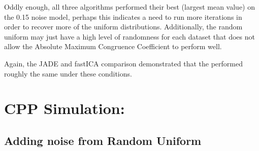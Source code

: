 \documentclass[12pt,twoside]{amherstthesis}
\begin{document}
  Oddly enough, all three algorithms performed their best (largest mean
  value) on the 0.15 noise model, perhaps this indicates a need to run
  more iterations in order to recover more of the uniform distributions.
  Additionally, the random uniform may just have a high level of
  randomness for each dataset that does not allow the Absolute Maximum
  Congruence Coefficient to perform well.
  
  Again, the JADE and fastICA comparison demonstrated that the performed
  roughly the same under these conditions.
  
  \section{CPP Simulation:}\label{cpp-simulation}
  
  \subsection{Adding noise from Random
  Uniform}\label{adding-noise-from-random-uniform}
  
  \begin{Shaded}
  \begin{Highlighting}[]
  \StringTok{ }
  \NormalTok{(}\NormalTok{)}
  \StringTok{ }\NormalTok{CPPdata[}\NormalTok{(}\NormalTok{),]}
  \NormalTok{(}\NormalTok{(}\NormalTok{),}\NormalTok{,}\NormalTok{)}
  \StringTok{ }
  \StringTok{ }\NormalTok{(}\NormalTok{,}\NormalTok{)}
  
  \StringTok{ }
  \StringTok{ }\NormalTok{(}
  \StringTok{ }\OperatorTok{:}
  \StringTok{ }\NormalTok{,}\NormalTok{)}
     \OperatorTok{:}
        \OperatorTok{<}
  \StringTok{ }\NormalTok{,}\NormalTok{)[i]}
  
  \NormalTok{      \}}\NormalTok{ \{}
  \StringTok{ }\NormalTok{CPPdata[}\NormalTok{(t)[}\NormalTok{]]}
  \NormalTok{      \}}
  \NormalTok{  \}}
  \StringTok{ }\NormalTok{,}
  \NormalTok{\}}
  \end{Highlighting}
  \end{Shaded}
  
\end{document}
